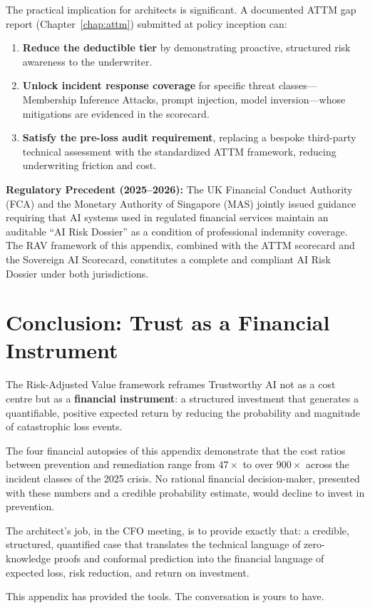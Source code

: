 The practical implication for architects is significant. A documented ATTM gap report (Chapter~\ref{chap:attm}) submitted at policy inception can:

\begin{enumerate}
  \item \textbf{Reduce the deductible tier} by demonstrating proactive, structured risk awareness to the underwriter.
  \item \textbf{Unlock incident response coverage} for specific threat classes---Membership Inference Attacks, prompt injection, model inversion---whose mitigations are evidenced in the scorecard.
  \item \textbf{Satisfy the pre-loss audit requirement}, replacing a bespoke third-party technical assessment with the standardized ATTM framework, reducing underwriting friction and cost.
\end{enumerate}

\begin{svgraybox}
\textbf{Regulatory Precedent (2025--2026):} The UK Financial Conduct Authority (FCA) and the Monetary Authority of Singapore (MAS) jointly issued guidance requiring that AI systems used in regulated financial services maintain an auditable ``AI Risk Dossier'' as a condition of professional indemnity coverage. The RAV framework of this appendix, combined with the ATTM scorecard and the Sovereign AI Scorecard, constitutes a complete and compliant AI Risk Dossier under both jurisdictions.
\end{svgraybox}

\section{Conclusion: Trust as a Financial Instrument}
\label{sec:app-conclusion}

The Risk-Adjusted Value framework reframes Trustworthy AI not
as a cost centre but as a \textbf{financial instrument}:
a structured investment that generates a quantifiable, positive
expected return by reducing the probability and magnitude of
catastrophic loss events.

The four financial autopsies of this appendix demonstrate that
the cost ratios between prevention and remediation range from
$47\times$ to over $900\times$ across the incident classes
of the 2025 crisis.
No rational financial decision-maker, presented with these
numbers and a credible probability estimate, would decline to
invest in prevention.

The architect's job, in the CFO meeting, is to provide exactly
that: a credible, structured, quantified case that translates
the technical language of zero-knowledge proofs and conformal
prediction into the financial language of expected loss,
risk reduction, and return on investment.

This appendix has provided the tools.
The conversation is yours to have.

